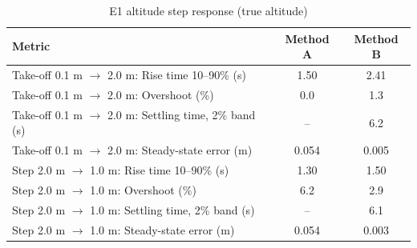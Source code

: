 \begin{table}[h]
\centering
\caption{E1 altitude step response (true altitude)}
\label{tab:e1}
\begin{tabular}{|p{8.2cm}|c|c|}
\hline
\textbf{Metric} & \textbf{Method A} & \textbf{Method B} \\ \hline
Take-off 0.1 m $\to$ 2.0 m: Rise time 10--90\% (s) & 1.50 & 2.41 \\ \hline
Take-off 0.1 m $\to$ 2.0 m: Overshoot (\%) & 0.0 & 1.3 \\ \hline
Take-off 0.1 m $\to$ 2.0 m: Settling time, 2\% band (s) & -- & 6.2 \\ \hline
Take-off 0.1 m $\to$ 2.0 m: Steady-state error (m) & 0.054 & 0.005 \\ \hline
Step 2.0 m $\to$ 1.0 m: Rise time 10--90\% (s) & 1.30 & 1.50 \\ \hline
Step 2.0 m $\to$ 1.0 m: Overshoot (\%) & 6.2 & 2.9 \\ \hline
Step 2.0 m $\to$ 1.0 m: Settling time, 2\% band (s) & -- & 6.1 \\ \hline
Step 2.0 m $\to$ 1.0 m: Steady-state error (m) & 0.054 & 0.003 \\ \hline
\end{tabular}
\end{table}
